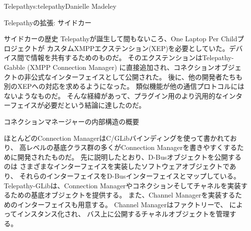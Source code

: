 \begin{aosachapter}{Telepathy}{s:telepathy}{Danielle Madeley}
\begin{aosasect1}{Telepathyの拡張: サイドカー}
\begin{aosabox}{サイドカーの歴史}
Telepathyが誕生して間もないころ、One Laptop Per Childプロジェクトが
カスタムXMPPエクステンション(XEP)を必要としていた。デバイス間で情報を共有するためのものだ。
そのエクステンションはTelepathy-Gabble (XMPP Connection Manager)
に直接追加され、コネクションオブジェクトの非公式なインターフェイスとして公開された。
後に、他の開発者たちも別のXEPへの対応を求めるようになった。
類似機能が他の通信プロトコルにはないようなものだ。
そんな経緯があって、プラグイン用のより汎用的なインターフェイスが必要だという結論に達したのだ。

\end{aosabox}

\end{aosasect1}

\begin{aosasect1}{コネクションマネージャーの内部構造の概要}

ほとんどのConnection ManagerはC/GLibバインディングを使って書かれており、
高レベルの基底クラス群の多くがConnection Managerを書きやすくするために開発されたものだ。
先に説明したとおり、D-Busオブジェクトを公開するのは
さまざまなインターフェイスを実装したソフトウェアオブジェクトであり、
それらのインターフェイスをD-Busインターフェイスとマップしている。
Telepathy-GLibは、Connection Managerやコネクションそしてチャネルを実装するための基底オブジェクトを提供する。
また、Channel Managerを実装するためのインターフェイスも用意する。
Channel Managerはファクトリーで、
によってインスタンス化され、
バス上に公開するチャネルオブジェクトを管理する。


\end{aosasect1}
\end{aosachapter}
